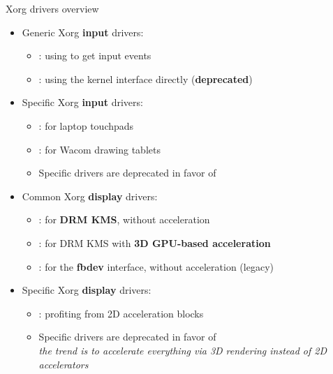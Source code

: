 \begin{frame}{Xorg drivers overview}
  \begin{itemize}
  \item Generic Xorg \textbf{input} drivers:
    \begin{itemize}
    \item {}: using  to get input events
    \item {}: using the  kernel interface directly (\textbf{deprecated})
    \end{itemize}
  \item Specific Xorg \textbf{input} drivers:
    \begin{itemize}
    \item {}: for laptop touchpads
    \item {}: for Wacom drawing tablets
    \item Specific drivers are deprecated in favor of 
    \end{itemize}
  \item Common Xorg \textbf{display} drivers:
    \begin{itemize}
    \item {}: for \textbf{DRM KMS}, without acceleration
    \item {}: for DRM KMS with \textbf{3D GPU-based acceleration}
    \item {}: for the \textbf{fbdev} interface, without acceleration (legacy)
    \end{itemize}
  \item Specific Xorg \textbf{display} drivers:
    \begin{itemize}
    \item {}: profiting from 2D acceleration blocks
    \item Specific drivers are deprecated in favor of \\
      \textit{the trend is to accelerate everything via 3D rendering instead of 2D accelerators}
    \end{itemize}
  \end{itemize}
\end{frame}

